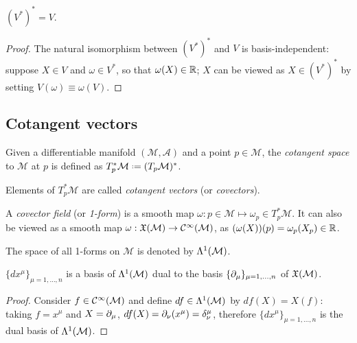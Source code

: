 \begin{proposition}
  $ (V^*)^* = V $.
\end{proposition}
\begin{proof}
  The natural isomorphism between $ (V^*)^* $ and $ V $ is basis-independent: suppose $ X \in V $ and $ \omega \in V^* $, so that $ \omega(X) \in \mathbb{R} $; $ X $ can be viewed as $ X \in (V^*)^* $ by setting $ V(\omega) \equiv \omega(V) $.
\end{proof}

\subsection{Cotangent vectors}

\begin{definition}
  Given a differentiable manifold $ (\mathcal{M},\mathcal{A}) $ and a point $ p \in \mathcal{M} $, the \textit{cotangent space} to $ \mathcal{M} $ at $ p $ is defined as $ T^*_p\mathcal{M} \defeq (T_p\mathcal{M})^* $.
\end{definition}

Elements of $ T^*_p\mathcal{M} $ are called \textit{cotangent vectors} (or \textit{covectors}).

\begin{definition}
  A \textit{covector field} (or \textit{1-form}) is a smooth map $ \omega : p \in \mathcal{M} \mapsto \omega_p \in T^*_p\mathcal{M} $. It can also be viewed as a smooth map $ \omega : \mathfrak{X}(\mathcal{M}) \rightarrow \mathcal{C}^{\infty}(\mathcal{M}) $, as $ (\omega(X))(p) = \omega_p(X_p) \in \mathbb{R} $.
\end{definition}

\begin{definition}
  The space of all 1-forms on $ \mathcal{M} $ is denoted by $ \Lambda^{1}(\mathcal{M}) $.
\end{definition}

\begin{proposition}
  $ \{dx^{\mu}\}_{\mu = 1,\dots,n} $ is a basis of $ \Lambda^{1}(\mathcal{M}) $ dual to the basis $ \{\partial_{\mu}\}_{\mu = 1,\dots,n} $ of $ \mathfrak{X}(\mathcal{M}) $.
\end{proposition}
\begin{proof}
  Consider $ f \in \mathcal{C}^{\infty}(\mathcal{M}) $ and define $ df \in \Lambda^{1}(\mathcal{M}) $ by $ df(X) = X(f) $: taking $ f = x^{\mu} $ and $ X = \partial_{\mu} $, $ df(X) = \partial_{\nu}(x^{\mu}) = \delta^{\mu}_{\nu} $, therefore $ \{dx^{\mu}\}_{\mu = 1,\dots,n} $ is the dual basis of $ \Lambda^{1}(\mathcal{M}) $.
\end{proof}

